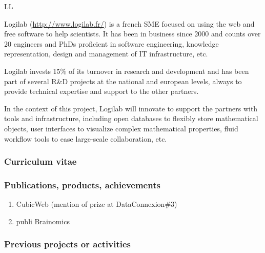 \begin{sitedescription}{LL}

Logilab (\url{http://www.logilab.fr/}) is a french SME focused on using the web and free software to help
scientists. It has been in business since 2000 and counts over 20 engineers and
PhDs proficient in software engineering, knowledge representation, design and
management of IT infrastructure, etc.

Logilab invests 15\% of its turnover in research and development and has been
part of several R\&D projects at the national and european levels, always to
provide technical expertise and support to the other partners.

In the context of this project, Logilab will innovate to support the partners
with tools and infrastructure, including open databases to flexibly store
mathematical objects, user interfaces to visualize complex mathematical
properties, fluid workflow tools to ease large-scale collaboration, etc.




\subsubsection*{Curriculum vitae}



%
%
%

\subsubsection*{Publications, products, achievements}

\begin{enumerate}
\item CubicWeb (mention of prize at DataConnexion\#3)
\item publi Brainomics
\end{enumerate}

\subsubsection*{Previous projects or activities}


\end{sitedescription}
